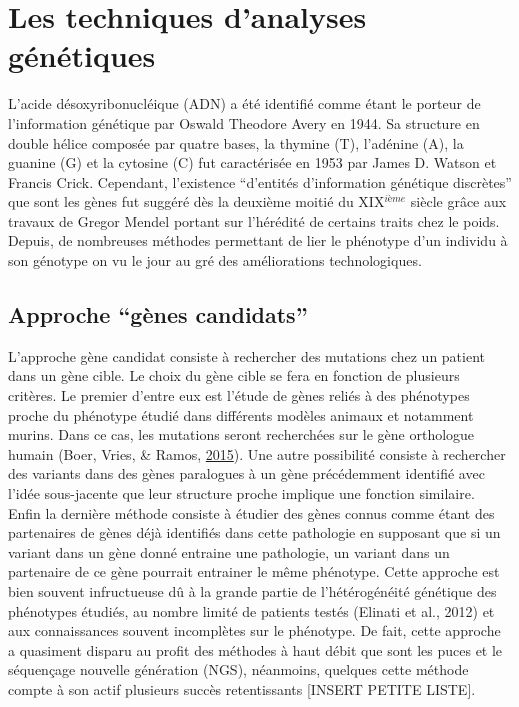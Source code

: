\documentclass[12pt,twoside]{reedthesis}
\theoremstyle{definition}
\theoremstyle{definition}
\theoremstyle{remark}
\begin{document}
  \newpage  
  
  \section{Les techniques d'analyses
  génétiques}\label{les-techniques-danalyses-genetiques}
  
  L'acide désoxyribonucléique (ADN) a été identifié comme étant le porteur
  de l'information génétique par Oswald Theodore Avery en 1944. Sa
  structure en double hélice composée par quatre bases, la thymine (T),
  l'adénine (A), la guanine (G) et la cytosine (C) fut caractérisée en
  1953 par James D. Watson et Francis Crick. Cependant, l'existence
  ``d'entités d'information génétique discrètes'' que sont les gènes fut
  suggéré dès la deuxième moitié du XIX\(^{ième}\) siècle grâce aux
  travaux de Gregor Mendel portant sur l'hérédité de certains traits chez
  le poids. Depuis, de nombreuses méthodes permettant de lier le phénotype
  d'un individu à son génotype on vu le jour au gré des améliorations
  technologiques.
  
  \subsection{\texorpdfstring{Approche ``gènes
  candidats''}{Approche gènes candidats}}\label{approche-genes-candidats}
  
  L'approche gène candidat consiste à rechercher des mutations chez un
  patient dans un gène cible. Le choix du gène cible se fera en fonction
  de plusieurs critères. Le premier d'entre eux est l'étude de gènes
  reliés à des phénotypes proche du phénotype étudié dans différents
  modèles animaux et notamment murins. Dans ce cas, les mutations seront
  recherchées sur le gène orthologue humain (Boer, Vries, \& Ramos,
  \protect\hyperlink{ref-DeBoer2015}{2015}). Une autre possibilité
  consiste à rechercher des variants dans des gènes paralogues à un gène
  précédemment identifié avec l'idée sous-jacente que leur structure
  proche implique une fonction similaire. Enfin la dernière méthode
  consiste à étudier des gènes connus comme étant des partenaires de gènes
  déjà identifiés dans cette pathologie en supposant que si un variant
  dans un gène donné entraine une pathologie, un variant dans un
  partenaire de ce gène pourrait entrainer le même phénotype. Cette
  approche est bien souvent infructueuse dû à la grande partie de
  l'hétérogénéité génétique des phénotypes étudiés, au nombre limité de
  patients testés (Elinati et al., 2012) et aux connaissances souvent
  incomplètes sur le phénotype. De fait, cette approche a quasiment
  disparu au profit des méthodes à haut débit que sont les puces et le
  séquençage nouvelle génération (NGS), néanmoins, quelques cette méthode
  compte à son actif plusieurs succès retentissants {[}INSERT PETITE
  LISTE{]}.
  
\end{document}

